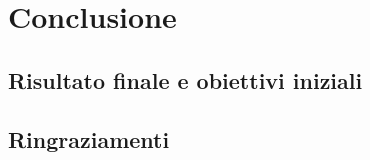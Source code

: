 \chapter{Conclusione}
    \section{Risultato finale e obiettivi iniziali}
    \section{Ringraziamenti}